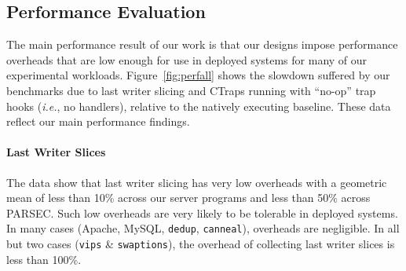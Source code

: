 \documentclass[preprint,9pt]{sigplanconf}
\newcommand{\addtodo}[1]{\textcolor{red}{[To do: #1]}}
\newcommand{\ctraps}{CTraps\xspace}
\begin{document}
%


\subsection{Performance Evaluation}
\label{sec:eval:perf}

The main performance result of our work is that our designs impose performance
overheads that are low enough for use in deployed systems for many of our
experimental workloads.  Figure~\ref{fig:perfall} shows the slowdown suffered
by our benchmarks due to last writer slicing and \ctraps running with ``no-op''
trap hooks ({\em i.e.}, no handlers), relative to the natively executing
baseline.  These data reflect our main performance findings.    

\paragraph{Last Writer Slices}
The data show that last writer slicing has very low overheads with a geometric
mean of less than 10\% across our server programs and less than 50\% across
PARSEC.  Such low overheads are very likely to be tolerable in deployed
systems.  In many cases (Apache, MySQL, {\tt dedup}, {\tt canneal}), overheads
are negligible.  In all but two cases ({\tt vips} \& {\tt swaptions}), the
overhead of collecting last writer slices is less than 100\%.    
\end{document}
